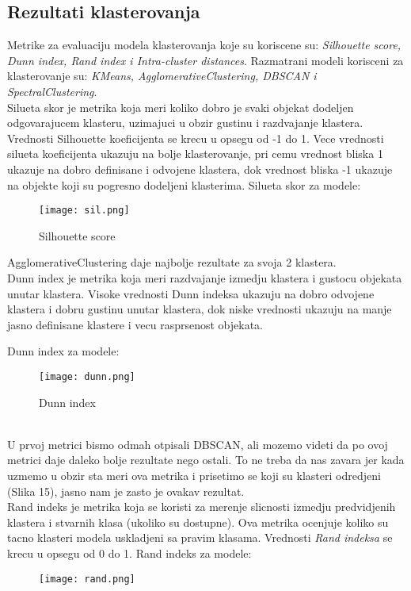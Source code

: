 \documentclass[10pt]{article}
\begin{document}
\pagebreak
\subsection*{Rezultati klasterovanja}
Metrike za evaluaciju modela klasterovanja koje su koriscene su: \textit{Silhouette score, Dunn index, Rand index i Intra-cluster distances}. Razmatrani modeli korisceni za klasterovanje su: \textit{KMeans, AgglomerativeClustering, DBSCAN i SpectralClustering}.\\

Silueta skor je metrika koja meri koliko dobro je svaki objekat dodeljen odgovarajucem klasteru, uzimajuci u obzir gustinu i razdvajanje klastera. Vrednosti Silhouette koeficijenta se krecu u opsegu od -1 do 1. Vece vrednosti silueta koeficijenta ukazuju na bolje klasterovanje, pri cemu vrednost bliska 1 ukazuje na dobro definisane i odvojene klastera, dok vrednost bliska -1 ukazuje na objekte koji su pogresno dodeljeni klasterima. Silueta skor za modele: 
\begin{figure}[h]
    \centering
    \texttt{[image: sil.png]}
    \caption{Silhouette score}
    \label{Slika11}
\end{figure}

AgglomerativeClustering daje najbolje rezultate za svoja 2 klastera.\\

Dunn index je metrika koja meri razdvajanje izmedju klastera i gustocu objekata unutar klastera. Visoke vrednosti Dunn indeksa ukazuju na dobro odvojene klastera i dobru gustinu unutar klastera, dok niske vrednosti ukazuju na manje jasno definisane klastere i vecu rasprsenost objekata.\pagebreak

Dunn index za modele:
\begin{figure}[h]
    \centering
    \texttt{[image: dunn.png]}
    \caption{Dunn index}
    \label{Slika12}
\end{figure}
\\

U prvoj metrici bismo odmah otpisali DBSCAN, ali mozemo videti da po ovoj metrici daje daleko bolje rezultate nego ostali. To ne treba da nas zavara jer kada uzmemo u obzir sta meri ova metrika i prisetimo se koji su klasteri odredjeni (Slika 15), jasno nam je zasto je ovakav rezultat.\\

Rand indeks je metrika koja se koristi za merenje slicnosti izmedju predvidjenih klastera i stvarnih klasa (ukoliko su dostupne). Ova metrika ocenjuje koliko su tacno klasteri modela uskladjeni sa pravim klasama.
Vrednosti \textit{Rand indeksa} se krecu u opsegu od 0 do 1. Rand indeks za modele:
\begin{figure}[h]
    \centering
    \texttt{[image: rand.png]}
    \label{Slika13}
\end{figure}
\\
\end{document}
